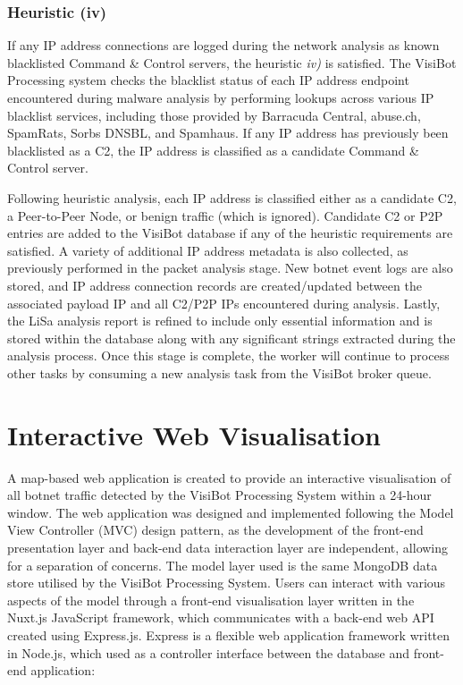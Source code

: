 \subsubsection{Heuristic (iv)} If any IP address connections are logged during the network analysis as known blacklisted Command \& Control servers, the heuristic \textit{iv)} is satisfied. The VisiBot Processing system checks the blacklist status of each IP address endpoint encountered during malware analysis by performing lookups across various IP blacklist services, including those provided by Barracuda Central, abuse.ch, SpamRats, Sorbs DNSBL, and Spamhaus. \cite{BarracudaCentral, AbuseCh, Spamrats, SorbsDnsbl, SpamhausZen} If any IP address has previously been blacklisted as a C2,  the IP address is classified as a candidate Command \& Control server.

Following heuristic analysis, each IP address is classified either as a candidate C2, a Peer-to-Peer Node, or benign traffic (which is ignored). Candidate C2 or P2P entries are added to the VisiBot database if any of the heuristic requirements are satisfied. A variety of additional IP address metadata is also collected, as previously performed in the packet analysis stage. New botnet event logs are also stored, and IP address connection records are created/updated between the associated payload IP and all C2/P2P IPs encountered during analysis. Lastly, the LiSa analysis report is refined to include only essential information and is stored within the database along with any significant strings extracted during the analysis process. Once this stage is complete, the worker will continue to process other tasks by consuming a new analysis task from the VisiBot broker queue.



\section{Interactive Web Visualisation}

A map-based web application is created to provide an interactive visualisation of all botnet traffic detected by the VisiBot Processing System within a 24-hour window. The web application was designed and implemented following the Model View Controller (MVC) design pattern, as the development of the front-end presentation layer and back-end data interaction layer are independent, allowing for a separation of concerns. The model layer used is the same MongoDB data store \citep{MongoDB} utilised by the VisiBot Processing System. Users can interact with various aspects of the model through a front-end visualisation layer written in the Nuxt.js \cite{NuxtJS} JavaScript framework, which communicates with a back-end web API created using Express.js. \citep{ExpressJS} Express is a flexible web application framework written in Node.js, \citep{NodeJS} which used as a controller interface between the database and front-end application:

